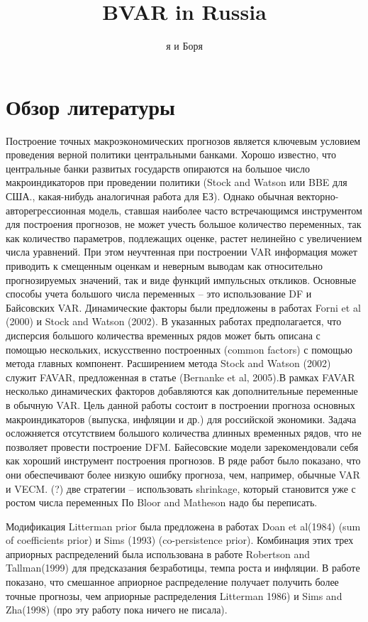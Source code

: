 \documentclass[11pt]{article} %
\title{BVAR in Russia}
\author{я и Боря}
\begin{document}
\maketitle

\section{Обзор литературы}

Построение точных  макроэкономических прогнозов является ключевым условием проведения верной политики центральными  банками.  Хорошо известно, что центральные банки развитых государств опираются на большое число макроиндикаторов при проведении политики (Stock and Watson или BBE для США., какая-нибудь аналогичная работа для ЕЗ). Однако обычная векторно-авторегрессионная модель, ставшая наиболее часто встречающимся инструментом для построения прогнозов, не может учесть большое количество переменных, так как количество параметров, подлежащих оценке, растет нелинейно с увеличением числа уравнений.  При этом неучтенная при построении VAR информация может приводить к смещенным оценкам и  неверным выводам  как относительно прогнозируемых значений, так и виде функций импульсных откликов.  Основные способы учета большого числа переменных – это использование DF и Байсовских VAR.
Динамические факторы были предложены в работах Forni et al (2000) и Stock and Watson (2002).  В указанных работах предполагается, что дисперсия большого количества временных рядов может быть описана с помощью нескольких, искусственно построенных (common factors)  с помощью метода главных компонент.  Расширением метода Stock and Watson (2002) служит FAVAR, предложенная в статье (Bernanke et al, 2005).В рамках FAVAR несколько динамических факторов  добавляются как дополнительные переменные в обычную VAR.
Цель данной работы состоит в построении  прогноза основных макроиндикаторов (выпуска, инфляции и др.) для российской экономики.  Задача осложняется отсутствием  большого количества длинных временных рядов, что не позволяет провести построение DFM.
Байесовские модели зарекомендовали себя как хороший инструмент построения прогнозов. В ряде работ было показано, что они обеспечивают более низкую ошибку прогноза, чем, например, обычные VAR и VECM.
(?) две стратегии – использовать shrinkage, который становится уже с ростом числа переменных
По Bloor and Matheson надо бы переписать.


Модификация Litterman prior была предложена в работах Doan et al(1984) (sum of coefficients prior) и Sims (1993)   (co-persistence prior).  Комбинация этих трех априорных распределений была использована в работе Robertson and Tallman(1999) для предсказания безработицы, темпа роста  и инфляции. В работе показано, что смешанное априорное распределение получает получить более точные прогнозы, чем априорные распределения Litterman 1986) и Sims and Zha(1998) (про эту работу пока ничего не писала).
\end{document}
